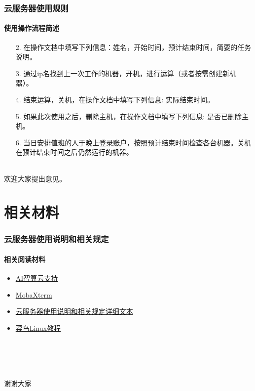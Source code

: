\documentclass[10pt]{beamer}
\begin{document}
        \begin{frame}
            \frametitle{云服务器使用规则}
                \framesubtitle{使用操作流程简述}

                    \begin{itemize}
                         \item [2. ]{在操作文档中填写下列信息：姓名，开始时间，预计结束时间，简要的任务说明。}
                        \item [3. ]{通过ip名找到上一次工作的机器，开机，进行运算（或者按需创建新机器）。}
                        \item [4. ]{结束运算，关机，在操作文档中填写下列信息: 实际结束时间。}
                        \item [5. ]{如果此次使用之后，删除主机，在操作文档中填写下列信息: 是否已删除主机。}
                        \item [6. ]{当日安排值班的人于晚上登录账户，按照预计结束时间检查各台机器。关机在预计结束时间之后仍然运行的机器。}
                    \end{itemize}
                    \hspace*{\fill}\\
                    \centering
                    {\large 欢迎大家提出意见。}

        \end{frame}


    \section{相关材料}
        \begin{frame}
            \frametitle{云服务器使用说明和相关规定}
                \framesubtitle{相关阅读材料}
                \begin{itemize}
                    \item \href{https://ai.blsc.cn/\#/support/info}{AI智算云支持} \\
                    \item \href{https://mobaxterm.mobatek.net}{MobaXterm} \\
                    \item \href{https://github.com/Ls-Dai/Cloud-Sever-Tutorial}{云服务器使用说明和相关规定详细文本} \\
                    \item \href{https://www.runoob.com/linux/linux-tutorial.html}{菜鸟Linux教程} \\
                \end{itemize}
                \hspace*{\fill} \\
                \hspace*{\fill} \\
                \hspace*{\fill} \\
                \hspace*{\fill} \\
                \centering
                {\huge 谢谢大家}
        \end{frame}
\end{document}
